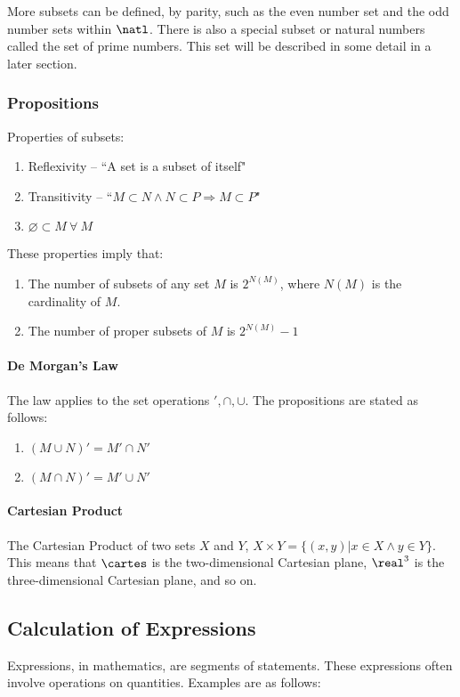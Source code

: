 More subsets can be defined, by parity, such as the even number set and the odd number sets within $\natl$. There is also a special subset or natural numbers called the set of prime numbers. This set will be described in some detail in a later section.

\subsubsection{Propositions}
Properties of subsets:
\begin{enumerate}
    \item Reflexivity -- ``A set is a subset of itself"
    \item Transitivity -- ``$M \subset N \land N \subset P \Longrightarrow M \subset P$"
    \item $\varnothing \subset M\ \forall\ M$
\end{enumerate}

These properties imply that:
\begin{enumerate}
    \item The number of subsets of any set $M$ is $2^{N(M)}$, where $N(M)$ is the cardinality of $M$.
    \item The number of proper subsets of $M$ is $2^{N(M)}-1$
\end{enumerate}

\paragraph{De Morgan's Law}
The law applies to the set operations $', \cap, \cup$.
The propositions are stated as follows:

\begin{enumerate}
    \item $(M \cup N)' = M' \cap N'$
    \item $(M \cap N)' = M' \cup N'$
\end{enumerate}

\paragraph{Cartesian Product}
The Cartesian Product of two sets $X$ and $Y$, $X \times Y = \{(x, y) | x \in X \land y \in Y\}$. This means that $\cartes$ is the two-dimensional Cartesian plane, $\real ^3$ is the three-dimensional Cartesian plane, and so on.

\subsection{Calculation of Expressions}
Expressions, in mathematics, are segments of statements.
These expressions often involve operations on quantities.
Examples are as follows:

